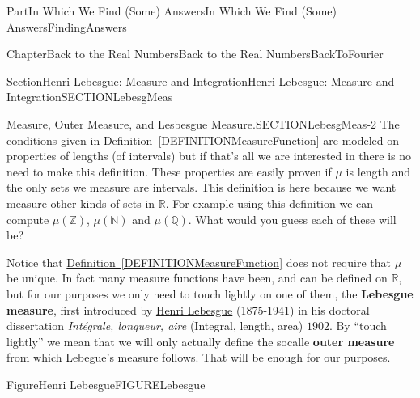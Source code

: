 \documentclass[oneside,10pt,]{book}
\newcommand{\xreffont}{\relax}
\newcommand{\terminology}[1]{\textbf{#1}}
\newcommand{\pubtitle}[1]{\textsl{#1}}
\numberwithin{equation}{part}
\newcommand{\RR}{\mathbb {R}}
\newcommand{\QQ}{\mathbb {Q}}
\newcommand{\NN}{\mathbb {N}}
\newcommand{\ZZ}{\mathbb {Z}}
\begin{document}
\begin{partptx}{Part}{In Which We Find (Some) Answers}{}{In Which We Find (Some) Answers}{}{}{FindingAnswers}
\begin{chapterptx}{Chapter}{Back to the Real Numbers}{}{Back to the Real Numbers}{}{}{BackToFourier}
\begin{sectionptx}{Section}{Henri Lebesgue: Measure and Integration}{}{Henri Lebesgue: Measure and Integration}{}{}{SECTIONLebesgMeas}
\begin{paragraphs}{Measure, Outer Measure, and  Lesbesgue Measure.}{SECTIONLebesgMeas-2}
The conditions given in \hyperref[DEFINITIONMeasureFunction]{Definition~{\xreffont\ref{DEFINITIONMeasureFunction}}} are modeled on properties of lengths (of intervals) but if that's all we are interested in there is no need to make this definition. These properties are easily proven if \(\mu{}\) is length and the only sets we measure are intervals. This definition is here because we want measure other kinds of sets in \(\RR{}\). For example using this definition we can compute \(\mu (\ZZ )\),  \(\mu (\NN{}) \) and \(\mu (\QQ) \). What would you guess each of these will be?%
\par
Notice that \hyperref[DEFINITIONMeasureFunction]{Definition~{\xreffont\ref{DEFINITIONMeasureFunction}}} does not require that \(\mu{}\) be unique. In fact many measure functions have been, and can be defined on \(\RR{}\), but for our purposes we only need to touch lightly on one of them, the \terminology{Lebesgue measure}, first introduced by \href{https://mathshistory.st-andrews.ac.uk/Biographies/Lebesgue/}{Henri Lebesgue} (1875-1941) in his doctoral dissertation \pubtitle{Intégrale, longueur, aire} (Integral, length, area) \(1902\). By ``touch lightly'' we mean that we will only actually define the so\textendash{}calle \terminology{outer measure} from which Lebegue's measure follows. That will be enough for our purposes.%
\begin{figureptx}{Figure}{Henri Lebesgue}{FIGURELebesgue}{}%
%
%
\begin{image}{0.325}{0.35}{0.325}{}%

\end{image}
\end{figureptx}
\end{paragraphs}
\end{sectionptx}
\end{chapterptx}
\end{partptx}
\end{document}
